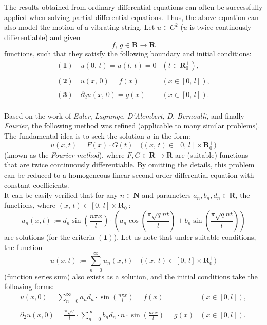 \documentclass[12pt]{article}
\begin{document}
The results obtained from ordinary differential equations can often be successfully applied when solving partial differential equations. Thus, the above equation can also model the motion of a vibrating string. Let $u \in C^2$ ($u$ is twice continously differentiable) and given
$$
f, \, g \in \mathbf{R} \to \mathbf{R}
$$
functions, such that they satisfy the following boundary and initial conditions:\\
$$
\begin{array}{ll}
	(\mathbf{1}) \quad u(0, \, t) = u(l, \, t) = 0 & (t \in \mathbf{R}^+_0), \\
	\\
	(\mathbf{2}) \quad u(x, \, 0) = f(x) & (x \in [0, \, l]), \\
	\\
	(\mathbf{3}) \quad \partial_2u(x, \, 0) = g(x) & (x \in [0, \, l]).
\end{array}
$$\\
Based on the work of \textit{Euler}, \textit{Lagrange}, \textit{D'Alembert}, \textit{D. Bernoulli}, and finally \textit{Fourier}, the following method was refined (applicable to many similar problems). The fundamental idea is to seek the solution $ u $ in the form:
$$
u(x, t) = F(x) \cdot G(t) \quad  \big((x, \, t) \in [0, \, l] \times \mathbf{R}_0^+ \big)
$$
(known as the \textit{Fourier method}), where $F, G \in \mathbf{R} \to \mathbf{R}$ are (suitable) functions that are twice continuously differentiable. By omitting the details, this problem can be reduced to a homogeneous linear second-order differential equation with constant coefficients.\\

It can be easily verified that for any $n \in \mathbf{N}$ and parameters $a_n, b_n, d_n \in \mathbf{R}$, the functions, where $(x, \, t) \in [0, \, l] \times \mathbf{R}_0^+$:
$$
u_n(x, t) := d_n \sin\left(\frac{n \pi x}{l}\right) \cdot \left(a_n \cos\left(\frac{\pi \sqrt{q} n t}{l}\right) + b_n \sin\left(\frac{\pi \sqrt{q} n t}{l}\right)\right)
$$
are solutions (for the criteria $(\mathbf{1})$). Let us note that under suitable conditions, the function
$$
u(x, t) := \sum_{n=0}^\infty u_n(x, t) \quad \big((x, \, t) \in [0, \, l] \times \mathbf{R}_0^+ \big)
$$
(function series sum) also exists as a solution, and the initial conditions take the following forms:
$$
\begin{array}{ll}
	\displaystyle u(x, 0) = \sum_{n=0}^\infty a_n d_n \cdot \sin\left(\frac{n \pi x}{l}\right) = f(x) & (x \in [0, l]),\\
	\\
	\displaystyle  \partial_2 u(x, 0) = \frac{\pi \sqrt{q}}{l} \cdot \sum_{n=0}^\infty b_n d_n \cdot n \cdot \sin\left(\frac{n \pi x}{l}\right) = g(x) & (x \in [0, l]).
\end{array}
$$
\end{document}
